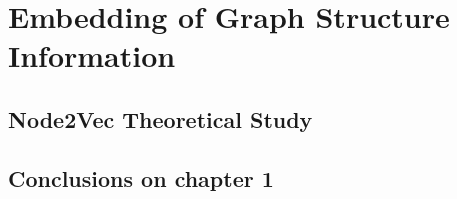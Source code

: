 \chapter{Embedding of Graph Structure Information}\label{chap:1}

\section{Node2Vec Theoretical Study}



\section{Conclusions on chapter 1}
